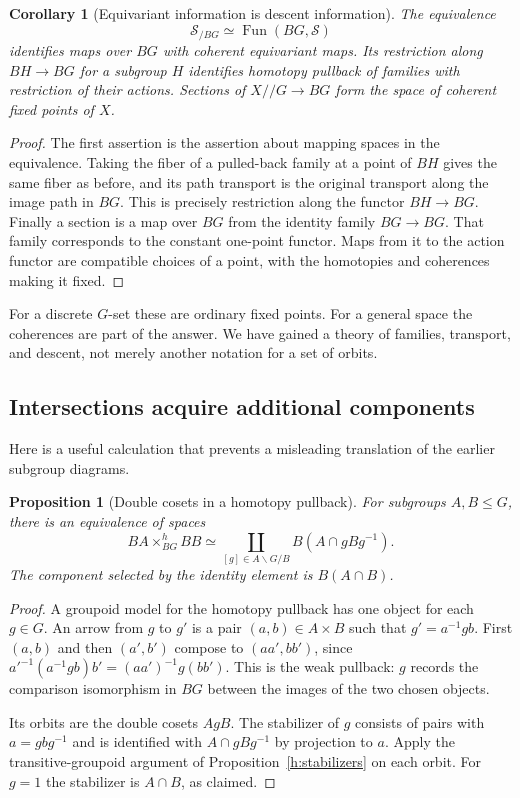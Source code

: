 \documentclass[11pt]{article}
\newtheorem{proposition}[theorem]{Proposition}
\newtheorem{corollary}[theorem]{Corollary}
\theoremstyle{definition}
\theoremstyle{remark}\newtheorem{remark}[theorem]{Remark}
\begin{document}
\begin{corollary}[Equivariant information is descent information]
\label{h:action-descent}
The equivalence
\[
 \mathcal S_{/BG}\simeq\operatorname{Fun}(BG,\mathcal S)
\]
identifies maps over $BG$ with coherent equivariant maps.  Its restriction
along $BH\to BG$ for a subgroup $H$ identifies homotopy pullback of families
with restriction of their actions.  Sections of $X/\!/G\to BG$ form the
space of coherent fixed points of $X$.
\end{corollary}
\begin{proof}
The first assertion is the assertion about mapping spaces in the
equivalence.  Taking the fiber of a pulled-back family at a point of $BH$
gives the same fiber as before, and its path transport is the original
transport along the image path in $BG$.  This is precisely restriction
along the functor $BH\to BG$.  Finally a section is a map over $BG$ from
the identity family $BG\to BG$.  That family corresponds to the constant
one-point functor.  Maps from it to the action functor are compatible
choices of a point, with the homotopies and coherences making it fixed.
\end{proof}

For a discrete $G$-set these are ordinary fixed points.  For a general
space the coherences are part of the answer.  We have gained a theory of
families, transport, and descent, not merely another notation for a set
of orbits.

\subsection{Intersections acquire additional components}

Here is a useful calculation that prevents a misleading translation of
the earlier subgroup diagrams.

\begin{proposition}[Double cosets in a homotopy pullback]
\label{h:double-coset}
For subgroups $A,B\leq G$, there is an equivalence of spaces
\[
 BA\times^h_{BG}BB
 \simeq
 \coprod_{[g]\in A\backslash G/B}
 B(A\cap gBg^{-1}).
\]
The component selected by the identity element is $B(A\cap B)$.
\end{proposition}
\begin{proof}
A groupoid model for the homotopy pullback has one object for each
$g\in G$.  An arrow from $g$ to $g'$ is a pair $(a,b)\in A\times B$
such that $g'=a^{-1}gb$.  First $(a,b)$ and then $(a',b')$ compose to
$(aa',bb')$, since $a'^{-1}(a^{-1}gb)b'=(aa')^{-1}g(bb')$.
This is the weak pullback: $g$ records the comparison isomorphism in
$BG$ between the images of the two chosen objects.

Its orbits are the double cosets $AgB$.  The stabilizer of $g$ consists
of pairs with $a=gbg^{-1}$ and is identified with $A\cap gBg^{-1}$ by
projection to $a$.  Apply the transitive-groupoid argument of
Proposition~\ref{h:stabilizers} on each orbit.  For $g=1$ the stabilizer
is $A\cap B$, as claimed.
\end{proof}
\end{document}
